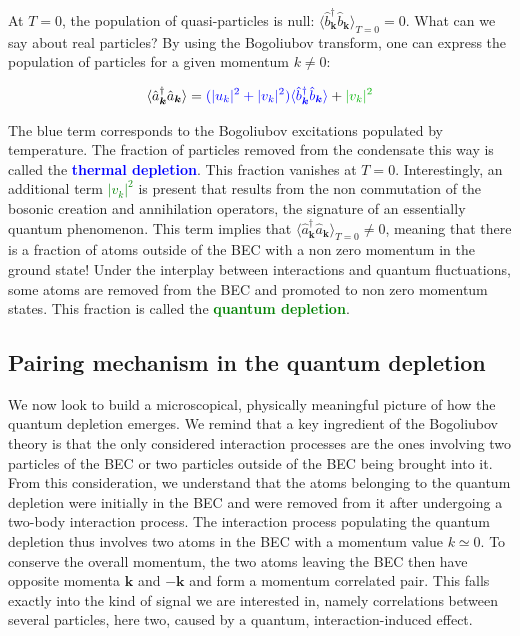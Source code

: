 \noindent At $T=0$, the population of quasi-particles is null: $\langle \hat{b}^{\dagger}_{\bm{k}}  \hat{b}_{\bm{k}} \rangle_{T=0}=0$. What can we say about real particles? By using the Bogoliubov transform, one can express the population of particles for a given momentum $k \neq 0$:

\begin{equation}
    \langle \hat{a}^{\dagger}_{\bm{k}}  \hat{a}_{\bm{k}} \rangle=\textcolor{blue}{(|u_k|^2+|v_k|^2)\langle \hat{b}^{\dagger}_{\bm{k}}  \hat{b}_{\bm{k}} \rangle} + \textcolor{green}{|v_k|^2}
\end{equation}

\noindent The blue term corresponds to the Bogoliubov excitations populated by temperature. The fraction of particles removed from the condensate this way is called the \textcolor{blue}{\textbf{thermal depletion}}. This fraction vanishes at $T=0$. Interestingly, an additional term \textcolor{green}{$|v_k|^2$} is present that results from the non commutation of the bosonic creation and annihilation operators, the signature of an essentially quantum phenomenon. This term implies that $\langle \hat{a}^{\dagger}_{\bm{k}}  \hat{a}_{\bm{k}} \rangle_{T=0} \neq 0$, meaning that there is a fraction of atoms outside of the BEC with a non zero momentum in the ground state! Under the interplay between interactions and quantum fluctuations, some atoms are removed from the BEC and promoted to non zero momentum states. This fraction is called the \textcolor{green}{\textbf{quantum depletion}}. 


\subsection{Pairing mechanism in the quantum depletion}

\label{sec:pairing_mechanism}

We now look to build a microscopical, physically meaningful picture of how the quantum depletion emerges. We remind that a key ingredient of the Bogoliubov theory is that the only considered interaction processes are the ones involving two particles of the BEC or two particles outside of the BEC being brought into it. From this consideration, we understand that the atoms belonging to the quantum depletion were initially in the BEC and were removed from it after undergoing a two-body interaction process. The interaction process populating the quantum depletion thus involves two atoms in the BEC with a momentum value $k \simeq 0$. To conserve the overall momentum, the two atoms leaving the BEC then have opposite momenta $\bm{k}$ and $-\bm{k}$ and form a momentum correlated pair. This falls exactly into the kind of signal we are interested in, namely correlations between several particles, here two, caused by a quantum, interaction-induced effect.

